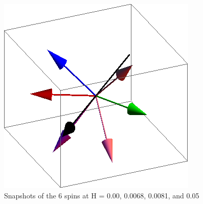\documentclass{article}
\begin{document}
\begin{figure}[ht]
\includegraphics[scale=0.33]{110/501S000to005R.png}
\caption{Snapshots of the 6 spins at H = 0.00, 0.0068, 0.0081, and 0.05}
\end{figure}
\clearpage
\end{document}

